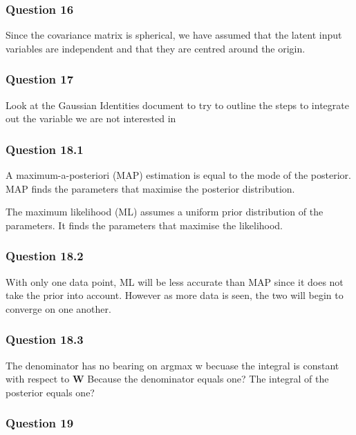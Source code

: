 \documentclass[10pt, a4paper, twocolumn]{article} %
\begin{document}
\subsubsection*{Question 16}

Since the covariance matrix is spherical, we have assumed that the latent input variables are independent and that they are centred around the origin. 

\subsubsection*{Question 17}

Look at the Gaussian Identities document to try to outline the steps to integrate out the variable we are not interested in

\subsubsection*{Question 18.1}
A maximum-a-posteriori (MAP) estimation is equal to the mode of the posterior. MAP finds the parameters that maximise the posterior distribution. \par
The maximum likelihood (ML) assumes a uniform prior distribution of the parameters. It finds the parameters that maximise the likelihood. 


\subsubsection*{Question 18.2}
With only one data point, ML will be less accurate than MAP since it does not take the prior into account. However as more data is seen, the two will begin to converge on one another. 

\subsubsection*{Question 18.3}
The denominator has no bearing on argmax w becuase the integral is constant with respect to $\mathbf{W}$
Because the denominator equals one? The integral of the posterior equals one?

\subsubsection*{Question 19}
\end{document}
